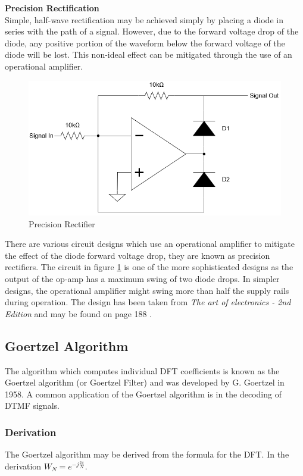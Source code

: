 \textbf{Precision Rectification}\\
Simple, half-wave rectification may be achieved simply by placing a diode in series with the path of a signal. However, due to the forward voltage drop of the diode, any positive portion of the waveform below the forward voltage of the diode will be lost. This non-ideal effect can be mitigated through the use of an operational amplifier.

\begin{figure}[H]
	\centering
	\includegraphics[width=0.6\linewidth]{figures/litreview/precision_rectifier.png}
	\caption{Precision Rectifier}
	\label{fig:precision_rectifier}
\end{figure}

There are various circuit designs which use an operational amplifier to mitigate the effect of the diode forward voltage drop, they are known as precision rectifiers. The circuit in figure \ref{fig:precision_rectifier} is one of the more sophisticated designs as the output of the op-amp has a maximum swing of two diode drops. In simpler designs, the operational amplifier might swing more than half the supply rails during operation. The design has been taken from \textit{The art of electronics - 2nd Edition} and may be found on page 188 \cite{Horowitz1995}.



\subsection{Goertzel Algorithm}
\label{sec:goertzel_lit_review}

The algorithm which computes individual DFT coefficients is known as the Goertzel algorithm (or Goertzel Filter) and was developed by G. Goertzel in 1958. \cite{Goertzel1958} A common application of the Goertzel algorithm is in the decoding of DTMF\footnotemark{} signals.

\subsubsection{Derivation}
The Goertzel algorithm may be derived from the formula for the DFT. In the derivation \(W_N = e^{-j\frac{2\pi}{N}}\).

